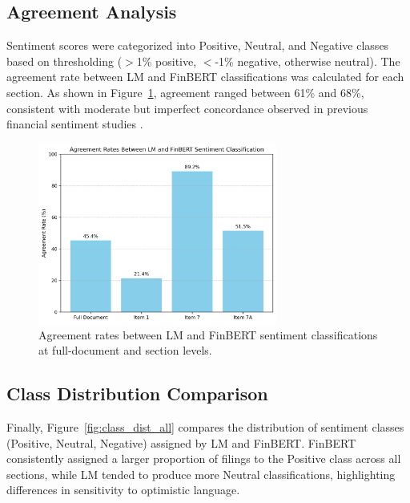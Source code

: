 \documentclass[12pt]{article}
\begin{document}
\subsection{Agreement Analysis}

Sentiment scores were categorized into Positive, Neutral, and Negative classes based on thresholding ($>$1\% positive, $<$-1\% negative, otherwise neutral). The agreement rate between LM and FinBERT classifications was calculated for each section. As shown in Figure~\ref{fig:agreement_bar}, agreement ranged between 61\% and 68\%, consistent with moderate but imperfect concordance observed in previous financial sentiment studies \citep{Li2010}.

\begin{figure}[H]
\centering
\includegraphics[width=0.7\textwidth]{figures/agreement_bar_chart.png}
\caption{Agreement rates between LM and FinBERT sentiment classifications at full-document and section levels.}
\label{fig:agreement_bar}
\end{figure}
\vspace{0.5cm}

\subsection{Class Distribution Comparison}

Finally, Figure~\ref{fig:class_dist_all} compares the distribution of sentiment classes (Positive, Neutral, Negative) assigned by LM and FinBERT. FinBERT consistently assigned a larger proportion of filings to the Positive class across all sections, while LM tended to produce more Neutral classifications, highlighting differences in sensitivity to optimistic language.
\end{document}
